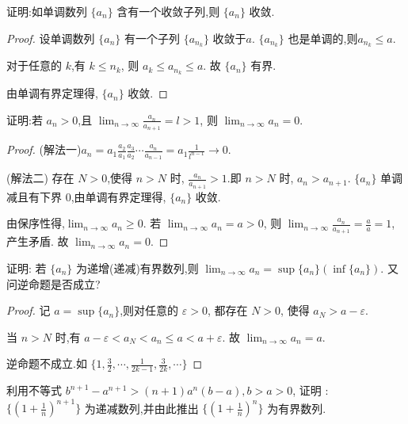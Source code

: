 \begin{practice}
    证明:如单调数列 $\{a_n\}$ 含有一个收敛子列,则 $\{a_n\}$ 收敛.
\end{practice}

\begin{proof}
    设单调数列 $\{a_n\}$ 有一个子列 $\{a_{n_k}\}$ 收敛于$a$.  $\{a_{n_k}\}$ 也是单调的,则$a_{n_k}\le a$.

    对于任意的 $k$,有 $k\le n_k$, 则 $a_k\le a_{n_k}\le a$. 故 $\{a_n\}$ 有界.

    由单调有界定理得, $\{a_n\}$ 收敛.
\end{proof}

\begin{practice} \label{prac:nnplus}
    证明:若 $a_n>0$,且 $\lim_{n\to\infty} \frac{a_n}{a_{n+1}}=l>1$, 则 $\lim_{n\to\infty} a_n=0$.
\end{practice}

\begin{proof}
    (解法一)$a_n=a_1\frac{a_2}{a_1}\frac{a_3}{a_2}\cdots \frac{a_n}{a_{n-1}}=a_1\frac{1}{l^{n-1}}\to 0$.

    (解法二) 存在 $N>0$,使得 $n>N$ 时, $\frac{a_n}{a_{n+1}}>1$.即 $n>N$ 时, $a_n>a_{n+1}$. $\{a_n\}$ 单调减且有下界 $0$,由单调有界定理得, $\{a_n\}$ 收敛.

    由保序性得,$\lim_{n\to\infty} a_n\ge 0$. 若 $\lim_{n\to\infty} a_n=a>0$, 则 $\lim_{n\to\infty} \frac{a_n}{a_{n+1}}=\frac{a}{a}=1$,产生矛盾. 故 $\lim_{n\to\infty} a_n=0$.
\end{proof}

\begin{practice}
    证明: 若 $\{a_n\}$ 为递增(递减)有界数列,则 $\lim_{n\to\infty} a_n=\sup \{a_n\} (\inf \{a_n\}).$ 又问逆命题是否成立?
\end{practice}

\begin{proof}
    记 $a=\sup \{a_n\}$,则对任意的 $\varepsilon>0$, 都存在 $N>0$, 使得 $a_N>a-\varepsilon$.

    当 $n>N$ 时,有 $a-\varepsilon<a_N<a_n\le a<a+\varepsilon$. 故 $\lim_{n\to\infty} a_n=a$.

    逆命题不成立.如 $\{1,\frac{3}{2},\cdots,\frac{1}{2k-1},\frac{3}{2k},\cdots\}$
\end{proof}

\begin{practice}\label{prac:eee}
    利用不等式 $b^{n+1}-a^{n+1}>(n+1)a^n(b-a),b>a>0$, 证明 : $\{(1+\frac{1}{n})^{n+1}\}$ 为递减数列,并由此推出 $\{(1+\frac{1}{n})^n\}$ 为有界数列.
\end{practice}

